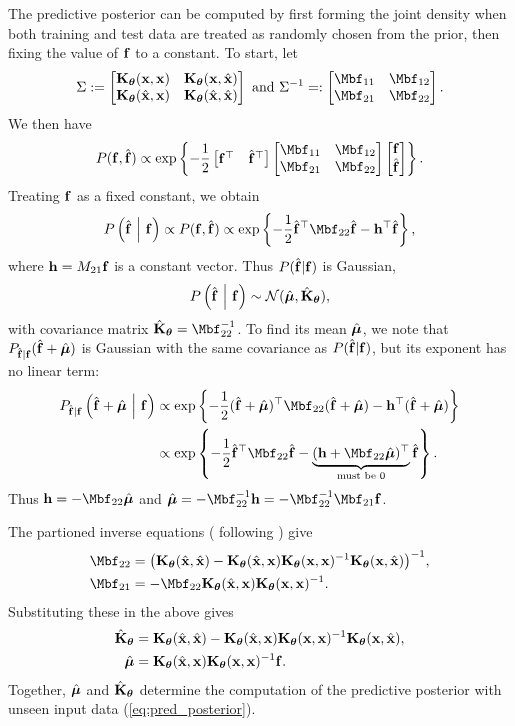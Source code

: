 The predictive posterior can be computed by first forming the joint density when both training and test data are treated as randomly chosen from the prior, then fixing the value of $\mathbf{f}$ to a constant.  To start, let
\[
  \Sigma := \bmat{
    \Ktheta(\xbf, \xbf)     & \Ktheta(\xbf, \hat\xbf)     \\
    \Ktheta(\hat\xbf, \xbf) & \Ktheta(\hat\xbf, \hat\xbf)
  }
  \text{ and }
  \Sigma^{-1} =: \bmat{
    \Mbf_{11} & \Mbf_{12} \\
    \Mbf_{21} & \Mbf_{22}
  }.
\]
We then have
\[
  P(\fbf, \hat\fbf)
  \propto
  \exp\br{
    -\frac12
    \bmat{\fbf^\top & \hat\fbf^\top}
    \bmat{\Mbf_{11} & \Mbf_{12} \\ \Mbf_{21} & \Mbf_{22}}
    \bmat{\fbf \\ \hat\fbf}
  }.
\]
Treating $\mathbf{f}$ as a fixed constant, we obtain
\[
  P\pn{\hat\fbf \mvert \fbf}
  \propto
  P(\fbf, \hat\fbf)
  \propto
  \exp\br{
    -\frac12 \hat\fbf^\top \Mbf_{22} \hat\fbf
    - \hbf^\top \hat\fbf
  },
\]
where $\mathbf{h} = M_{21} \mathbf{f}$ is a constant vector.  Thus $P(\hat{\mathbf{f}} | \mathbf{f})$ is Gaussian,
\begin{equation}\label{eq:pred_posterior}
  P\left( \hat{\mathbf{f}} \ \middle\vert\  \mathbf{f} \right) \sim \mathcal{N}(\hat{\bm{\mu}}, \hat{\mathbf{K}}_{\bm{\theta}}),
\end{equation}
with covariance matrix $\hat\Kbf_{\thetabf} = \Mbf_{22}^{-1}$.  To find its mean $\hat{\bm{\mu}}$, we note that $P_{\hat{\mathbf{f}}|\mathbf{f}}(\hat{\mathbf{f}} + \hat{\bm{\mu}})$ is Gaussian with the same covariance as $P(\hat{\mathbf{f}} | \mathbf{f})$, but its exponent has no linear term:
\begin{align*}
  P_{\hat\fbf|\fbf} \pn{\hat\fbf + \hat\mubf \mvert \fbf}
  &\propto
  \exp\br{
    -\frac12 (\hat\fbf + \hat\mubf)^\top \Mbf_{22} (\hat\fbf + \hat\mubf)
    - \hbf^\top (\hat\fbf + \hat\mubf)
  } \\
  &\propto
  \exp\br{
    -\frac12 \hat\fbf^\top \Mbf_{22} \hat\fbf
    - \underbrace{(\hbf + \Mbf_{22} \hat\mubf)^\top}_{\text{must be $0$}} \hat\fbf
  }.
\end{align*}
Thus $\hbf = -\Mbf_{22} \hat\mubf$ and $\hat\mubf = -\Mbf_{22}^{-1} \hbf =
-\Mbf_{22}^{-1} \Mbf_{21} \fbf$.

The partioned inverse equations (\citealp*{barnett1979matrix} following \citealp*{mackay1998introduction}) give
\begin{align*}
  \Mbf_{22} &= \big(\Ktheta(\hat\xbf,\hat\xbf) - \Ktheta(\hat\xbf,\xbf) \Ktheta(\xbf,\xbf)^{-1}
\Ktheta(\xbf,\hat\xbf)\big)^{-1}, \\
  \Mbf_{21} &= -\Mbf_{22} \Ktheta(\hat\xbf,\xbf) \Ktheta(\xbf,\xbf)^{-1}.
\end{align*}
Substituting these in the above gives
\begin{align}
  \hat{\mathbf{K}}_{\bm{\theta}} &= \mathbf{K}_{\bm{\theta}}(\hat{\mathbf{x}},\hat{\mathbf{x}}) - \mathbf{K}_{\bm{\theta}}(\hat{\mathbf{x}},\mathbf{x})
\mathbf{K}_{\bm{\theta}}(\mathbf{x},\mathbf{x})^{-1} \mathbf{K}_{\bm{\theta}}(\mathbf{x},\hat{\mathbf{x}}),\label{eq:K_hat} \\
  \hat{\bm{\mu}} &= \mathbf{K}_{\bm{\theta}}(\hat{\mathbf{x}},\mathbf{x}) \mathbf{K}_{\bm{\theta}}(\mathbf{x},\mathbf{x})^{-1}\mathbf{f}.\label{eq:mu_hat}
\end{align}
Together, $\hat{\bm{\mu}}$ and $\hat{\mathbf{K}}_{\bm{\theta}}$ determine the computation of the predictive posterior
with unseen input data (\ref{eq:pred_posterior}).

